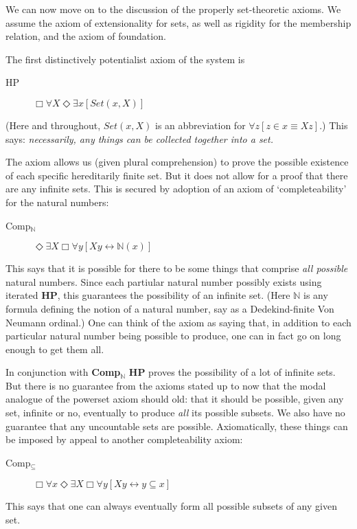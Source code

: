 \documentclass{article}
\begin{document}
We can now move on to the discussion of the properly set-theoretic axioms. 
We assume the axiom of extensionality for sets, as well as rigidity for the 
membership relation, and the axiom of foundation. 

The first distinctively potentialist axiom of the system is 
\begin{description} 
    \item[HP] $\Box \forall X \Diamond \exists x [Set(x, X)]$
\end{description}
(Here and throughout, $Set(x, X)$ is an abbreviation for 
$\forall z[z \in x \equiv Xz]$.) This says: \emph{necessarily, any 
things can be collected together into a set.} 

The axiom allows us (given plural comprehension) to prove the possible existence 
of each specific hereditarily finite set. But it does not allow for a proof that 
there are any infinite sets. This is secured by adoption of an axiom of 
`completeability' for the natural numbers:
\begin{description}
    \item[Comp$_\mathbb{N}$]
    $\Diamond \exists X \Box \forall y[ Xy \leftrightarrow \mathbb{N}(x)]$
\end{description}
This says that it is possible for there to be some things that comprise \emph{all possible}
natural numbers. Since each partiular natural number possibly exists using iterated 
{\bf HP}, this guarantees the possibility of an infinite set. (Here $\mathbb{N}$ is any formula 
defining the notion of a natural number, say as a Dedekind-finite 
Von Neumann ordinal.) One can think of the axiom as saying that, in addition to 
each particular natural number being possible to produce, one can in fact go on long 
enough to get them all.

In conjunction with {\bf Comp$_\mathbb{N}$} {\bf HP} proves the possibility of a lot of
infinite sets. But there is no guarantee from the axioms stated up to now that 
the modal analogue of the powerset axiom should old: that it should be possible, 
given any set, infinite or no, eventually to produce \emph{all} its possible subsets. 
We also have no guarantee that any uncountable sets are possible.
Axiomatically, these things can be imposed by appeal to another completeability axiom:
\begin{description}
    \item[Comp$_\subseteq$]
    $\Box \forall x \Diamond \exists X \Box \forall y[ Xy \leftrightarrow y \subseteq x]$
\end{description}
This says that one can always eventually form all possible subsets of any given set.
\end{document}
